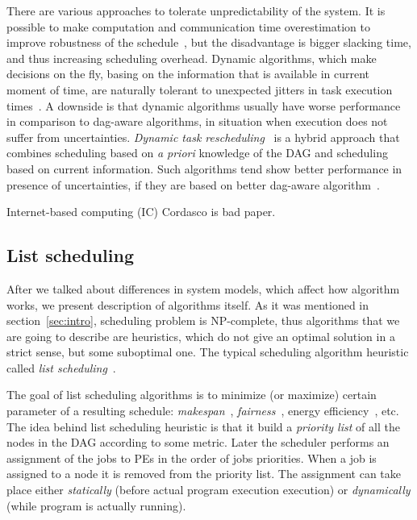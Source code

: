 There are various approaches to tolerate unpredictability of the
system. It is possible to make computation and communication time
overestimation to improve robustness of the schedule~, but
the disadvantage is bigger slacking time, and thus increasing
scheduling overhead. Dynamic algorithms, which make decisions on the
fly, basing on the information that is available in current moment of
time, are naturally tolerant to unexpected jitters in task execution
times~. A downside is that dynamic algorithms
usually have worse performance in comparison to dag-aware algorithms,
in situation when execution does not suffer from
uncertainties. \emph{Dynamic task
  rescheduling}~\cite{sakellariou2004low,maheswaran1998dynamic} is a
hybrid approach that combines scheduling based on \textit{a priori}
knowledge of the DAG and scheduling based on current information. Such
algorithms tend show better performance in presence of uncertainties,
if they are based on better dag-aware
algorithm~\cite{canon2008comparative}.

Internet-based computing (IC) \cite{cordasco2010extending,
  rosenberg2004scheduling} Cordasco is
bad paper.

\subsection{List scheduling}
\label{sec:list}

After we talked about differences in system models, which affect how
algorithm works, we present description of algorithms itself. As it
was mentioned in section~\ref{sec:intro}, scheduling problem is
NP-complete, thus algorithms that we are going to describe are
heuristics, which do not give an optimal solution in a strict sense,
but some suboptimal one. The typical scheduling algorithm heuristic
called \emph{list scheduling}~\cite{adam1974, Papadimitriou1979,
  schutten1996list, kwok1999static, falzon2012enhancing,
  arabnejad2014list}.

The goal of list scheduling algorithms is to minimize (or maximize)
certain parameter of a resulting schedule:
\emph{makespan}~\cite{arabnejad2014list},
\emph{fairness}~\cite{zaharia2010delay}, energy
efficiency~\cite{zong2013green}, etc. The idea behind list scheduling
heuristic is that it build a \emph{priority list} of all the nodes in
the DAG according to some metric. Later the scheduler performs an
assignment of the jobs to PEs in the order of jobs priorities. When a
job is assigned to a node it is removed from the priority list. The
assignment can take place either \emph{statically} (before actual
program execution execution) or \emph{dynamically} (while program is
actually running).

